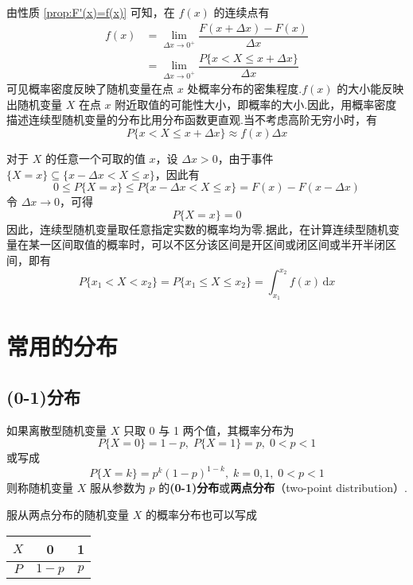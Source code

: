 由性质 \ref*{prop:F'(x)=f(x)} 可知，在 $f(x)$ 的连续点有
$$
\begin{aligned}
    f(x) &= \lim_{\Delta x \to 0^+} \dfrac{F(x + \Delta x)-F(x)}{\Delta x}\\
    &= \lim_{\Delta x \to 0^+} \dfrac{P\{x < X \leqslant x + \Delta x\}}{\Delta x}
\end{aligned}
$$
可见概率密度反映了随机变量在点 $x$ 处概率分布的密集程度.$f(x)$ 的大小能反映出随机变量 $X$ 在点 $x$ 附近取值的可能性大小，即概率的大小.因此，用概率密度描述连续型随机变量的分布比用分布函数更直观.当不考虑高阶无穷小时，有
$$
P\{x < X \leqslant x + \Delta x\} \approx f(x) \Delta x
$$

对于 $X$ 的任意一个可取的值 $x$，设 $\Delta x > 0$，由于事件 $\{X=x\} \subseteq \{x - \Delta x < X \leqslant x\}$，因此有
$$
0 \leqslant P\{X=x\} \leqslant P\{x - \Delta x < X \leqslant x\} = F(x)-F(x-\Delta x)
$$
令 $\Delta x \to 0$，可得
$$
P\{X=x\}=0
$$
因此，连续型随机变量取任意指定实数的概率均为零.据此，在计算连续型随机变量在某一区间取值的概率时，可以不区分该区间是开区间或闭区间或半开半闭区间，即有
$$
P\{x_1 < X < x_2\} = P\{x_1 \leqslant X \leqslant x_2\} = \int_{x_1}^{x_2} f(x)\,\text{d}x
$$

\section{常用的分布}

\subsection{(0-1)分布}

\begin{definition}
    如果离散型随机变量 $X$ 只取 0 与 1 两个值，其概率分布为
    $$
    P\{X=0\}=1-p, \; P\{X=1\}=p, \; 0<p<1
    $$
    或写成
    $$
    P\{X=k\}=p^k (1-p)^{1-k}, \; k=0,1, \; 0<p<1
    $$
    则称随机变量 $X$ 服从参数为 $p$ 的\textbf{(0-1)分布}或\textbf{两点分布}（two-point distribution）.
\end{definition}

服从两点分布的随机变量 $X$ 的概率分布也可以写成
\begin{table*}[htbp]
    \centering

    \begin{tabular}{c | c c}
        \hline
        $X$ & 0 & 1 \\
        \hline
        $P$ & $1-p$ & $p$ \\
        \hline
    \end{tabular}
\end{table*}

